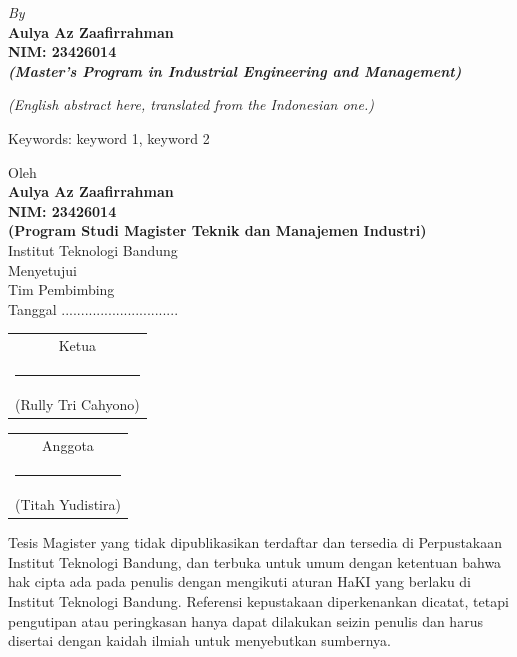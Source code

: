 \documentclass[twoside]{itb-tmi}
\begin{document}
\begin{center}\vspace{\baselineskip}\textit{By}\\{\bfseries Aulya Az Zaafirrahman\\NIM: 23426014\\\textit{(Master’s Program in Industrial Engineering and Management)}}\end{center}
\vspace{3\baselineskip}
\begin{singlespace}\itshape\setlength{\parskip}{\baselineskip}\noindent (English abstract here, translated from the Indonesian one.)

\noindent Keywords: keyword 1, keyword 2
\end{singlespace}
\clearpage{}
\begin{center}
\vspace{2\baselineskip}Oleh\\{\bfseries Aulya Az Zaafirrahman\\NIM: 23426014\\\small(Program Studi Magister Teknik dan Manajemen Industri)}\\[1.5\baselineskip]
Institut Teknologi Bandung\\[3\baselineskip]
Menyetujui\\Tim Pembimbing\\[1\baselineskip]Tanggal ..............................\\[2\baselineskip]
\begin{tabular}[t]{@{}c@{}}Ketua\\[3\baselineskip]\rule{5cm}{0.4pt}\\(Rully Tri Cahyono)\end{tabular}\hfill \begin{tabular}[t]{@{}c@{}}Anggota\\[3\baselineskip]\rule{5cm}{0.4pt}\\(Titah Yudistira)\end{tabular}
\end{center}
Tesis Magister yang tidak dipublikasikan terdaftar dan tersedia di Perpustakaan Institut Teknologi Bandung, dan terbuka untuk umum dengan ketentuan bahwa hak cipta ada pada penulis dengan mengikuti aturan HaKI yang berlaku di Institut Teknologi Bandung. Referensi kepustakaan diperkenankan dicatat, tetapi pengutipan atau peringkasan hanya dapat dilakukan seizin penulis dan harus disertai dengan kaidah ilmiah untuk menyebutkan sumbernya.
\end{document}

